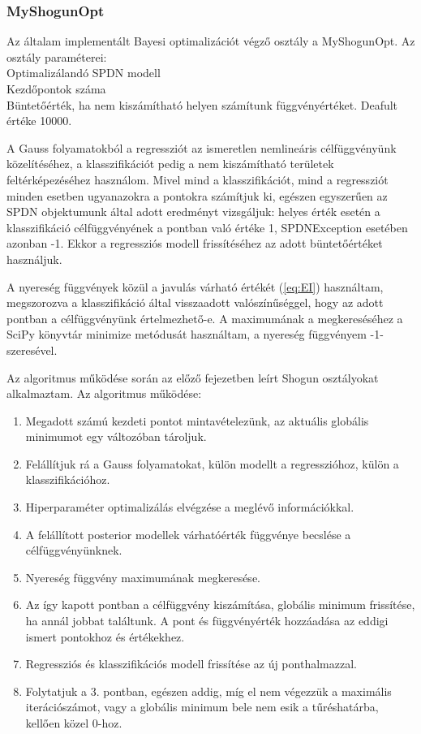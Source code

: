 \subsubsection{MyShogunOpt}

Az általam implementált Bayesi optimalizációt végző osztály a MyShogunOpt. Az osztály paraméterei:\\
Optimalizálandó SPDN modell\\
Kezdőpontok száma\\
Büntetőérték, ha nem kiszámítható helyen számítunk függvényértéket. Deafult értéke 10000.

A Gauss folyamatokból a regressziót az ismeretlen nemlineáris célfüggvényünk közelítéséhez, a klasszifikációt pedig a nem kiszámítható területek feltérképezéséhez használom. Mivel mind a klasszifikációt, mind a regressziót minden esetben ugyanazokra a pontokra számítjuk ki, egészen egyszerűen az SPDN objektumunk által adott eredményt vizsgáljuk: helyes érték esetén a klasszifikáció célfüggvényének a pontban való értéke 1, SPDNException esetében azonban -1. Ekkor a regressziós modell frissítéséhez az adott büntetőértéket használjuk.

A nyereség függvények közül a javulás várható értékét (\ref{eq:EI}) használtam, megszorozva a klasszifikáció által visszaadott valószínűséggel, hogy az adott pontban a célfüggvényünk értelmezhető-e. A maximumának a megkereséséhez a SciPy könyvtár minimize metódusát használtam, a nyereség függvényem -1-szeresével.

Az algoritmus működése során az előző fejezetben leírt Shogun osztályokat alkalmaztam. Az algoritmus működése:

\begin{enumerate}
	\item Megadott számú kezdeti pontot mintavételezünk, az aktuális globális minimumot egy változóban tároljuk.
	\item Felállítjuk rá a Gauss folyamatokat, külön modellt a regresszióhoz, külön a klasszifikációhoz.
	\item Hiperparaméter optimalizálás elvégzése a meglévő információkkal.
	\item A felállított posterior modellek várhatóérték függvénye becslése a célfüggvényünknek.
	\item Nyereség függvény maximumának megkeresése.
	\item Az így kapott pontban a célfüggvény kiszámítása, globális minimum frissítése, ha annál jobbat találtunk. A pont és függvényérték hozzáadása az eddigi ismert pontokhoz és értékekhez. 
	\item Regressziós és klasszifikációs modell frissítése az új ponthalmazzal.
	\item Folytatjuk a 3. pontban, egészen addig, míg el nem végezzük a maximális iterációszámot, vagy a globális minimum bele nem esik a tűréshatárba, kellően közel 0-hoz.
\end{enumerate}











